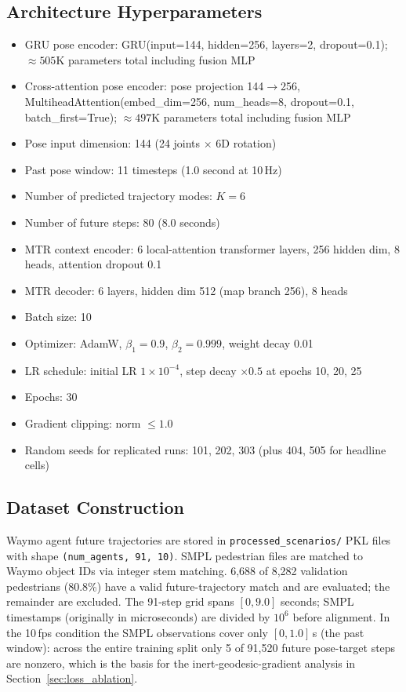 \documentclass{article} %
\begin{document}
\subsection{Architecture Hyperparameters}
\begin{itemize}
  \item GRU pose encoder: GRU(input=144, hidden=256, layers=2, dropout=0.1);
        ${\approx}505$K parameters total including fusion MLP
  \item Cross-attention pose encoder: pose projection 144$\to$256,
        MultiheadAttention(embed\_dim=256, num\_heads=8, dropout=0.1,
        batch\_first=True); ${\approx}497$K parameters total including fusion MLP
  \item Pose input dimension: 144 (24 joints $\times$ 6D rotation)
  \item Past pose window: 11 timesteps (1.0 second at 10\,Hz)
  \item Number of predicted trajectory modes: $K=6$
  \item Number of future steps: 80 (8.0 seconds)
  \item MTR context encoder: 6 local-attention transformer layers, 256 hidden dim,
        8 heads, attention dropout 0.1
  \item MTR decoder: 6 layers, hidden dim 512 (map branch 256), 8 heads
  \item Batch size: 10
  \item Optimizer: AdamW, $\beta_1=0.9$, $\beta_2=0.999$, weight decay 0.01
  \item LR schedule: initial LR $1{\times}10^{-4}$, step decay $\times 0.5$ at
        epochs 10, 20, 25
  \item Epochs: 30
  \item Gradient clipping: norm $\leq 1.0$
  \item Random seeds for replicated runs: 101, 202, 303 (plus 404, 505 for headline cells)
\end{itemize}

\subsection{Dataset Construction}
\label{app:dataset}
Waymo agent future trajectories are stored in \texttt{processed\_scenarios/}
PKL files with shape \texttt{(num\_agents, 91, 10)}. SMPL pedestrian files are
matched to Waymo object IDs via integer stem matching. 6{,}688 of 8{,}282
validation pedestrians (80.8\%) have a valid future-trajectory match and are
evaluated; the remainder are excluded. The 91-step grid spans $[0, 9.0]$
seconds; SMPL timestamps (originally in microseconds) are divided by $10^6$
before alignment. In the 10\,fps condition the SMPL observations cover only
$[0, 1.0]$\,s (the past window): across the entire training split only 5 of
91{,}520 future pose-target steps are nonzero, which is the basis for the
inert-geodesic-gradient analysis in Section~\ref{sec:loss_ablation}.
\end{document}
